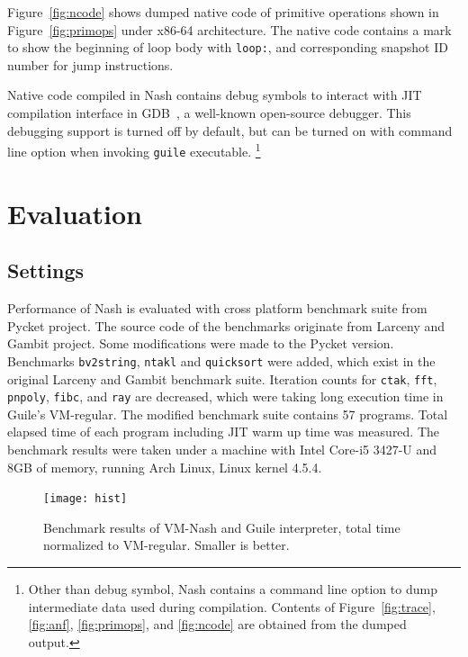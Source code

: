 \documentclass[preprint, 10pt]{sigplanconf}
\begin{document}
Figure~\hyperref[fig:ncode]{\ref{fig:ncode}} shows dumped native code of
primitive operations shown in Figure~\hyperref[fig:primops]{\ref{fig:primops}}
under x86-64 architecture. The native code contains a mark to show the
beginning of loop body with \texttt{loop:}, and corresponding snapshot ID
number for jump instructions.

Native code compiled in Nash contains debug symbols to interact with JIT
compilation interface in GDB~\cite{stallman2002debugging}, a well-known
open-source debugger. This debugging support is turned off by default, but can
be turned on with command line option when invoking \texttt{guile} executable.
\footnote{Other than debug symbol, Nash contains a command line option to dump
  intermediate data used during compilation. Contents of
  Figure~\hyperref[fig:anf]{\ref{fig:trace}}, \hyperref[fig:anf]{\ref{fig:anf}},
  \hyperref[fig:primops]{\ref{fig:primops}}, and
  \hyperref[fig:ncode]{\ref{fig:ncode}} are obtained from the dumped output.}

\section{Evaluation}
\label{sec:evaluation}

\subsection{Settings}

Performance of Nash is evaluated with cross platform benchmark suite from
Pycket project. The source code of the benchmarks originate from Larceny and
Gambit project. Some modifications were made to the Pycket version. Benchmarks
\texttt{bv2string}, \texttt{ntakl} and \texttt{quicksort} were added, which
exist in the original Larceny and Gambit benchmark suite. Iteration counts for
\texttt{ctak}, \texttt{fft}, \texttt{pnpoly}, \texttt{fibc}, and \texttt{ray}
are decreased, which were taking long execution time in Guile's
VM-regular. The modified benchmark suite contains 57 programs. Total elapsed
time of each program including JIT warm up time was measured. The benchmark
results were taken under a machine with Intel Core-i5 3427-U and 8GB of
memory, running Arch Linux, Linux kernel 4.5.4.

\begin{figure}
  \centering
  \texttt{[image: hist]}
  \caption{Benchmark results of VM-Nash and Guile interpreter, total time
    normalized to VM-regular. Smaller is better.}
  \label{fig:bench}
\end{figure}
\end{document}
